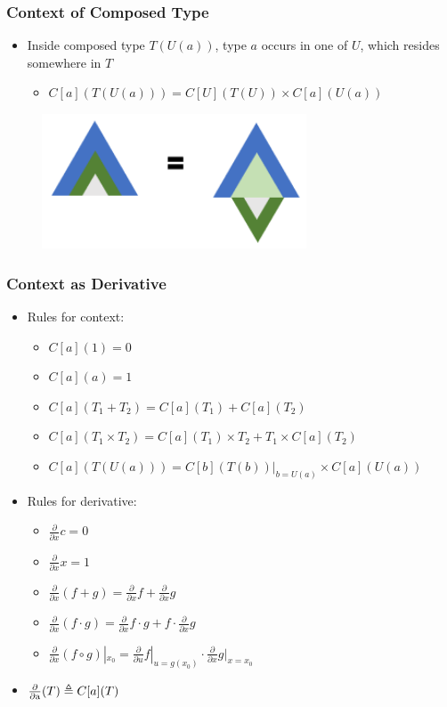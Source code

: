 \begin{frame}
\frametitle{Context of Composed Type}

\begin{itemize}
\item Inside composed type $T(U(a))$, type $a$ occurs in one of $U$,
which resides somewhere in $T$
\begin{itemize}
\item $C[a](T(U(a))) = C[U](T(U)) \times  C[a](U(a))$
\end{itemize}
\end{itemize}

\begin{figure}
\centering
\includegraphics[width=0.7\textwidth]{figure/comp}
\end{figure}
\end{frame}

\begin{frame}
\frametitle{Context as Derivative}
\begin{itemize}
\item Rules for context:
\begin{itemize}
\item $C[a](1) = 0$
\item $C[a](a) = 1$
\item $C[a](T_1 + T_2) = C[a](T_1) + C[a](T_2)$
\item $C[a](T_1 \times  T_2) = C[a](T_1)\times T_2 + T_1\times C[a](T_2)$
\item $C[a](T(U(a))) = C[b](T(b))|_{b=U(a)} \times  C[a](U(a))$
\end{itemize}

\item Rules for derivative:
\begin{itemize}
\item $\frac{\partial}{\partial x}c = 0$
\item $\frac{\partial}{\partial x}x = 1$
\item $\frac{\partial}{\partial x}(f+g) = \frac{\partial}{\partial x}f + \frac{\partial}{\partial x}g$
\item $\frac{\partial}{\partial x}(f\cdot g) = \frac{\partial}{\partial x}f \cdot g
+ f \cdot \frac{\partial}{\partial x}g$
\item $\frac{\partial}{\partial x}(f\circ g)|_{x_0} =
\frac{\partial}{\partial u}f|_{u=g(x_0)}
\cdot \frac{\partial}{\partial x}g|_{x=x_0}$
\end{itemize}

\item $\operatorname{\frac{\partial}{\partial a}} (T) \triangleq C[a](T)$
\end{itemize}
\end{frame}

